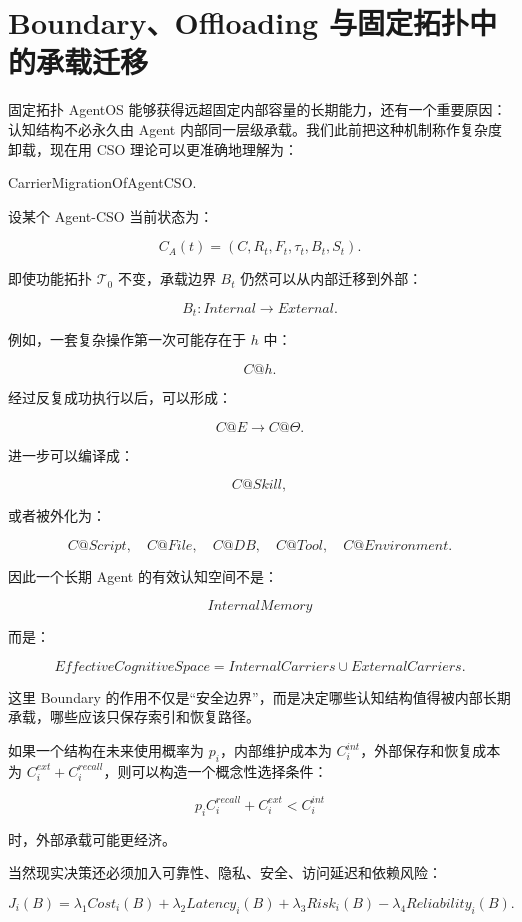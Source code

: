 \section{Boundary、Offloading 与固定拓扑中的承载迁移}

固定拓扑 AgentOS 能够获得远超固定内部容量的长期能力，还有一个重要原因：认知结构不必永久由 Agent 内部同一层级承载。我们此前把这种机制称作复杂度卸载，现在用 CSO 理论可以更准确地理解为：

\begin{statementbox}
CarrierMigrationOfAgentCSO.
\end{statementbox}

设某个 Agent-CSO 当前状态为：

\[
C_A(t)
=
(C,R_t,F_t,\tau_t,B_t,S_t).
\]

即使功能拓扑 $\mathcal{T}_0$ 不变，承载边界 $B_t$ 仍然可以从内部迁移到外部：

\[
B_t:
Internal
\rightarrow
External.
\]

例如，一套复杂操作第一次可能存在于 $h$ 中：

\[
C@h.
\]

经过反复成功执行以后，可以形成：

\[
C@E
\rightarrow
C@\Theta.
\]

进一步可以编译成：

\[
C@Skill,
\]

或者被外化为：

\[
C@Script,
\quad
C@File,
\quad
C@DB,
\quad
C@Tool,
\quad
C@Environment.
\]

因此一个长期 Agent 的有效认知空间不是：

\[
InternalMemory
\]

而是：

\[
\boxed{
EffectiveCognitiveSpace
=
InternalCarriers
\cup
ExternalCarriers.
}
\]

这里 Boundary 的作用不仅是“安全边界”，而是决定哪些认知结构值得被内部长期承载，哪些应该只保存索引和恢复路径。

如果一个结构在未来使用概率为 $p_i$，内部维护成本为 $C_i^{int}$，外部保存和恢复成本为 $C_i^{ext}+C_i^{recall}$，则可以构造一个概念性选择条件：

\[
p_iC_i^{recall}
+
C_i^{ext}
<
C_i^{int}
\]

时，外部承载可能更经济。

当然现实决策还必须加入可靠性、隐私、安全、访问延迟和依赖风险：

\[
J_i(B)
=
\lambda_1 Cost_i(B)
+
\lambda_2 Latency_i(B)
+
\lambda_3 Risk_i(B)
-
\lambda_4 Reliability_i(B).
\]

